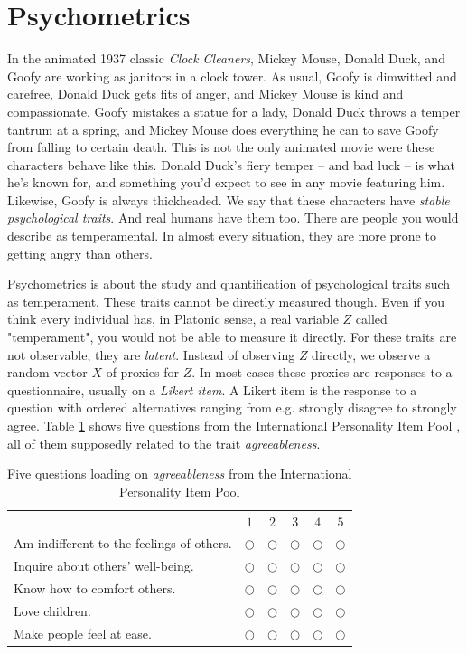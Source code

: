 
\section{Psychometrics}
In the animated 1937 classic \textit{Clock Cleaners}, Mickey Mouse, Donald Duck, and Goofy are working as janitors in a clock tower. As usual, Goofy is dimwitted and carefree, Donald Duck gets fits of anger, and Mickey Mouse is kind and compassionate. Goofy mistakes a statue for a lady, Donald Duck throws a temper tantrum at a spring, and Mickey Mouse does everything he can to save Goofy from falling to certain death. This is not the only animated movie were these characters behave like this. Donald Duck's fiery temper -- and bad luck -- is what he's known for, and something you'd expect to see in any movie featuring him. Likewise, Goofy is always thickheaded. We say that these characters have \textit{stable psychological traits}. And real humans have them too. There are people you would describe as temperamental. In almost every situation, they are more prone to getting angry than others.

Psychometrics is about the study and quantification of psychological traits such as temperament. These traits cannot be directly measured though. Even if you think every individual has, in Platonic sense, a real variable $Z$ called "temperament", you would not be able to measure it directly. For these traits are not observable, they are \textit{latent}. Instead of observing $Z$ directly, we observe a random vector $X$ of proxies for $Z$. In most cases these proxies are responses to a questionnaire, usually on a \emph{Likert item}. A Likert item is the response to a question with ordered alternatives ranging from e.g. strongly disagree to strongly agree. Table \ref{tab:IPIP} shows five questions from the International Personality Item Pool \parencite{Goldberg1992-hp}, all of them supposedly related to the trait \textit{agreeableness}.

\begin{table}
\caption{\label{tab:IPIP}Five questions loading on \textit{agreeableness} from the International Personality Item Pool}
\noindent \begin{centering}
\begin{tabular}{lccccc}
 & $1$ & $2$ & $3$ & $4$ & $5$\tabularnewline
Am indifferent to the feelings of others.  & $\bigcirc$ & $\bigcirc$ & $\bigcirc$ & $\bigcirc$ & $\bigcirc$\tabularnewline
Inquire about others' well-being. & $\bigcirc$ & $\bigcirc$ & $\bigcirc$ & $\bigcirc$ & $\bigcirc$\tabularnewline
Know how to comfort others. & $\bigcirc$ & $\bigcirc$ & $\bigcirc$ & $\bigcirc$ & $\bigcirc$\tabularnewline
Love children. & $\bigcirc$ & $\bigcirc$ & $\bigcirc$ & $\bigcirc$ & $\bigcirc$\tabularnewline
Make people feel at ease.  & $\bigcirc$ & $\bigcirc$ & $\bigcirc$ & $\bigcirc$ & $\bigcirc$\tabularnewline
\end{tabular}
\par\end{centering}
\vskip7.0pt
\noindent {}
\end{table}

